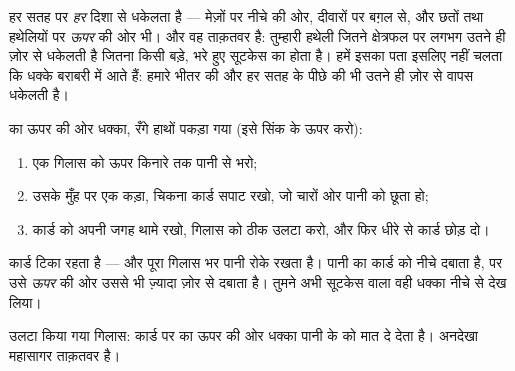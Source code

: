 \begin{proposition}[हर ओर से धक्का]\label{prop:g5:air-pressure-weather:allsides}
 हर सतह पर \emph{हर} दिशा से धकेलता है --- मेज़ों पर नीचे की
ओर, दीवारों पर बग़ल से, और छतों तथा हथेलियों पर \emph{ऊपर} की ओर भी।
और वह ताक़तवर है: तुम्हारी हथेली जितने क्षेत्रफल पर  लगभग उतने ही
ज़ोर से धकेलती है जितना किसी बड़े, भरे हुए सूटकेस का  होता है। हमें
इसका पता इसलिए नहीं चलता कि धक्के बराबरी में आते हैं: हमारे भीतर की
और हर सतह के पीछे की  भी उतने ही ज़ोर से वापस धकेलती है।
\end{proposition}

\begin{method}[वह कार्ड जो पानी रोक लेता है]\label{met:g5:air-pressure-weather:card}
 का ऊपर की ओर धक्का, रँगे हाथों पकड़ा गया (इसे सिंक के ऊपर करो):
\begin{enumerate}
  \item एक गिलास को ऊपर किनारे तक पानी से भरो;
  \item उसके मुँह पर एक कड़ा, चिकना कार्ड सपाट रखो, जो चारों ओर पानी
        को छूता हो;
  \item कार्ड को अपनी जगह थामे रखो, गिलास को ठीक उलटा करो, और फिर
        धीरे से कार्ड छोड़ दो।
\end{enumerate}
कार्ड टिका रहता है --- और पूरा गिलास भर पानी रोके रखता है। पानी का 
कार्ड को नीचे दबाता है, पर  उसे \emph{ऊपर} की ओर उससे भी
ज़्यादा ज़ोर से दबाता है। तुमने अभी सूटकेस वाला वही धक्का नीचे से देख
लिया।
\end{method}

\begin{omfigure}

{\small उलटा किया गया गिलास: कार्ड पर  का ऊपर की ओर धक्का पानी के
 को मात दे देता है। अनदेखा महासागर ताक़तवर है।}
\end{omfigure}

